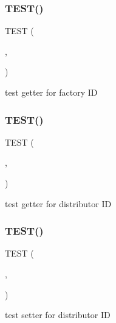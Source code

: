 \subsubsection{\texorpdfstring{T\+E\+S\+T()}{TEST()}\hspace{0.1cm}{\footnotesize\ttfamily [10/54]}}
{\footnotesize\ttfamily T\+E\+ST (\begin{DoxyParamCaption}\item[{game\+Test}]{,  }\item[{get\+P\+Fact\+Id\+Test}]{ }\end{DoxyParamCaption})}

test getter for factory ID \mbox{\label{group__group2_gaefd1a042142830ac77e7de99e0387890}} 
\subsubsection{\texorpdfstring{T\+E\+S\+T()}{TEST()}\hspace{0.1cm}{\footnotesize\ttfamily [11/54]}}
{\footnotesize\ttfamily T\+E\+ST (\begin{DoxyParamCaption}\item[{game\+Test}]{,  }\item[{get\+P\+Distributor\+Id\+Test}]{ }\end{DoxyParamCaption})}

test getter for distributor ID \mbox{\label{group__group2_ga21272b3bbdbfe2e069f4251d44c25f70}} 
\subsubsection{\texorpdfstring{T\+E\+S\+T()}{TEST()}\hspace{0.1cm}{\footnotesize\ttfamily [12/54]}}
{\footnotesize\ttfamily T\+E\+ST (\begin{DoxyParamCaption}\item[{game\+Test}]{,  }\item[{set\+P\+Distributor\+Id\+Test}]{ }\end{DoxyParamCaption})}

test setter for distributor ID \mbox{\label{group__group2_gab476eb42629b88e6becad5a4fc3a35aa}} 
